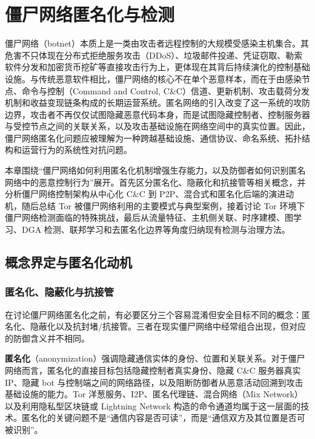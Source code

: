 \section{僵尸网络匿名化与检测}
\label{sec:botnet_anonymization_detection}

僵尸网络（botnet）本质上是一类由攻击者远程控制的大规模受感染主机集合。其危害不只体现在分布式拒绝服务攻击（DDoS）、垃圾邮件投递、凭证窃取、勒索软件分发和加密货币挖矿等直接攻击行为上，更体现在其背后持续演化的控制基础设施。与传统恶意软件相比，僵尸网络的核心不在单个恶意样本，而在于由感染节点、命令与控制（Command and Control, C\&C）信道、更新机制、攻击载荷分发机制和收益变现链条构成的长期运营系统。匿名网络的引入改变了这一系统的攻防边界，攻击者不再仅仅试图隐藏恶意代码本身，而是试图隐藏控制者、控制服务器与受控节点之间的关联关系，以及攻击基础设施在网络空间中的真实位置。因此，僵尸网络匿名化问题应被理解为一种跨越基础设施、通信协议、命名系统、拓扑结构和运营行为的系统性对抗问题。

本章围绕“僵尸网络如何利用匿名化机制增强生存能力，以及防御者如何识别匿名网络中的恶意控制行为”展开。首先区分匿名化、隐蔽化和抗接管等相关概念，并分析僵尸网络控制架构从中心化 C\&C 到 P2P、混合式和匿名化后端的演进动机，随后总结 Tor 被僵尸网络利用的主要模式与典型案例，接着讨论 Tor 环境下僵尸网络检测面临的特殊挑战，最后从流量特征、主机侧关联、时序建模、图学习、DGA 检测、联邦学习和去匿名化边界等角度归纳现有检测与治理方法。

\subsection{概念界定与匿名化动机}
\label{subsec:botnet_framework}

\subsubsection{匿名化、隐蔽化与抗接管}

在讨论僵尸网络匿名化之前，有必要区分三个容易混淆但安全目标不同的概念：匿名化、隐蔽化以及抗封堵/抗接管。三者在现实僵尸网络中经常组合出现，但对应的防御含义并不相同。

\textbf{匿名化}（anonymization）强调隐藏通信实体的身份、位置和关联关系。对于僵尸网络而言，匿名化的直接目标包括隐藏控制者真实身份、隐藏 C\&C 服务器真实 IP、隐藏 bot 与控制端之间的网络路径，以及阻断防御者从恶意活动回溯到攻击基础设施的能力。Tor 洋葱服务、I2P、匿名代理链、混合网络（Mix Network）以及利用隐私型区块链或 Lightning Network 构造的命令通道均属于这一层面的技术。匿名化的关键问题不是“通信内容是否可读”，而是“通信双方及其位置是否可被识别”。

